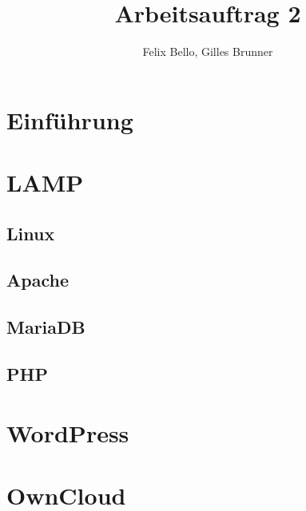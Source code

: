\documentclass{article}
\author{Felix Bello, Gilles Brunner}
\title{Arbeitsauftrag 2}
\begin{document}
	\maketitle
	\section{Einführung}
	\section{LAMP}
	\subsection{Linux}
	\subsection{Apache}
	\subsection{MariaDB}
	\subsection{PHP}
	\section{WordPress}
	\section{OwnCloud}
\end{document}
